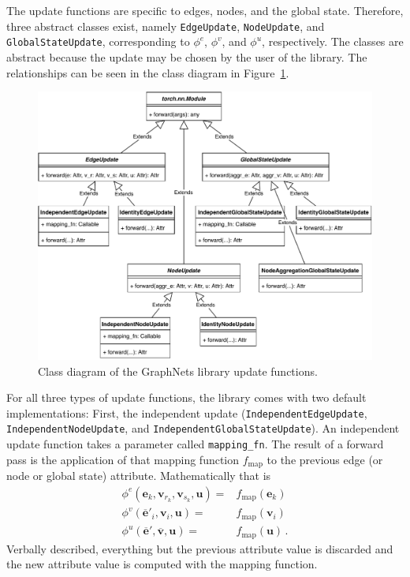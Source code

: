 The update functions are specific to edges, nodes, and the global state. Therefore, three abstract classes exist, namely \texttt{EdgeUpdate}, \texttt{NodeUpdate}, and \texttt{GlobalStateUpdate}, corresponding to $\phi^e$, $\phi^v$, and $\phi^u$, respectively. The classes are abstract because the update may be chosen by the user of the library. The relationships can be seen in the class diagram in Figure~\ref{fig:classdiagramgnfunctionsupdate}.

\begin{figure}\centering
    \includegraphics[scale=0.65]{resources/graphnets-functions-update}
    \caption[Class diagram of the GraphNets library update functions]{Class diagram of the GraphNets library update functions.}\label{fig:classdiagramgnfunctionsupdate}
\end{figure}

For all three types of update functions, the library comes with two default implementations: First, the independent update (\texttt{IndependentEdgeUpdate}, \texttt{IndependentNodeUpdate}, and \texttt{IndependentGlobalStateUpdate}). An independent update function takes a parameter called \texttt{mapping\_fn}. The result of a forward pass is the application of that mapping function $f_\text{map}$ to the previous edge (or node or global state) attribute. Mathematically that is \begin{align}
\phi^e\left(\bm{e}_k,\bm{v}_{r_k},\bm{v}_{s_k},\bm{u}\right)=&f_\text{map}\left(\bm{e}_k\right)\\
\phi^v\left(\bm{\overline{e}}'_i,\bm{v}_i,\bm{u}\right)=&f_\text{map}\left(\bm{v}_i\right)\\
\phi^u\left(\bm{\overline{e}}',\bm{\overline{v}},\bm{u}\right)=&f_\text{map}\left(\bm{u}\right)\,.
\end{align}Verbally described, everything but the previous attribute value is discarded and the new attribute value is computed with the mapping function.

